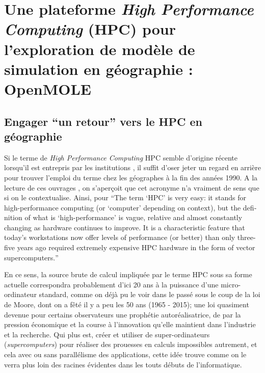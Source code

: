 
\newcommand\litem[1]{\item{\bfseries #1,\enspace}}

\section{Une plateforme \textit{High Performance Computing} (HPC) pour l'exploration de modèle de simulation en géographie : OpenMOLE}
\label{ssec:Introduction}

\subsection{Engager \enquote{un retour} vers le HPC en géographie}
\label{sec:retourHPC}

Si le terme de \textit{High Performance Computing} HPC semble d'origine récente lorsqu'il est entrepris par les institutions \autocite{HPCHorizon2020}, il suffit d'oser jeter un regard en arrière pour trouver l'emploi du terme chez les géographes à la fin des années 1990. A la lecture de ces ouvrages \autocites{Turton1998, Openshaw2000, Openshaw2000b}, on s'aperçoit que cet acronyme n'a vraiment de sens que si on le contextualise. Ainsi, pour \textcite{Openshaw2000} \foreignquote{english}{The term \enquote{HPC} is very easy: it stands for high-performance computing (or \enquote{computer} depending on context), but the definition of what is \enquote{high-performance} is vague, relative and almost constantly changing as hardware continues to improve. It is a characteristic feature that today's workstations now offer levels of performance (or better) than only three-five years ago required extremely expensive HPC hardware in the form of vector supercomputers.}

En ce sens, la source brute de calcul impliquée par le terme HPC sous sa forme actuelle correspondra probablement d'ici 20 ans à la puissance d'une micro-ordinateur standard, comme on déjà pu le voir dans le passé sous le coup de la loi de Moore, dont on a fêté il y a peu les 50 ans (1965 - 2015); une loi quasiment devenue pour certains observateurs une prophétie autoréalisatrice, de par la pression économique et la course à l'innovation qu'elle maintient dans l'industrie et la recherche. Qui plus est, créer et utiliser de super-ordinateurs (\textit{supercomputers}) pour réaliser des prouesses en calculs impossibles autrement, et cela avec ou sans parallélisme des applications, cette idée trouve comme on le verra plus loin des racines évidentes dans les touts débuts de l'informatique.

